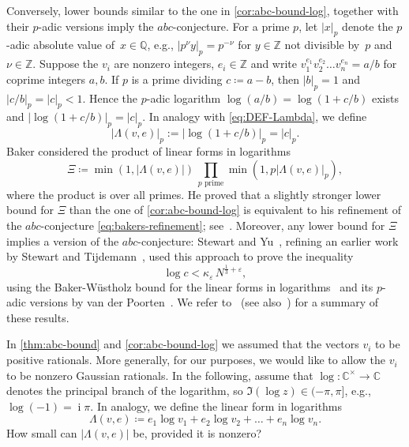 \documentclass[a4paper,USenglish,cleveref,numberwithinsect]{lipics-v2021}
\DeclareMathOperator{\ii}{i}
\newcommand{\QQ}{\mathbb{Q}}
\newcommand{\CC}{\mathbb{C}}
\newcommand{\ZZ}{\mathbb{Z}}
\numberwithin{equation}{section}
\begin{document}
\begin{remark}
Conversely, lower bounds similar to the one in \cref{cor:abc-bound-log},
together with their $p$-adic versions imply the $abc$-conjecture.
For a prime $p$, let $|x|_p$ denote the $p$-adic absolute value of~$x\in\QQ$,
e.g., $|p^\nu y|_p = p^{-\nu}$ for $y\in\ZZ$ not divisible by~$p$ and $\nu\in\ZZ$.
Suppose the $v_i$ are nonzero integers, $e_i\in\ZZ$ and write
$v_1^{e_1} v_2^{e_2}\dots v_n^{e_n} = a/b$ for coprime integers $a,b$.
If $p$ is a prime dividing $c\coloneqq a-b$,
then $|b|_p=1$ and $|c/b|_p = |c|_p <1$.
Hence the $p$-adic logarithm $\log(a/b)=\log(1+c/b)$ exists %
and $|\log(1+c/b)|_p = |c|_p$.
In analogy with \cref{eq:DEF-Lambda}, %
we define
\[
 |\Lambda(v,e)|_p := |\log(1+c/b)|_p = |c|_p.
\]
Baker considered the product of linear forms in logarithms
\[
 \Xi \coloneqq \min( 1 , |\Lambda(v,e)| ) \, \prod_{p\text{ prime}} \min( 1, p |\Lambda(v,e)|_p) ,
\]
where the product is over all primes.
He proved that a slightly stronger lower bound for $\Xi$ than the one of \cref{cor:abc-bound-log}
is equivalent to his refinement of the $abc$-conjecture \cref{eq:bakers-refinement};
see~\cite[Section~5]{baker98}.
Moreover, any lower bound for $\Xi$ implies a version of the $abc$-conjecture:
Stewart and Yu~\cite{yu-stewart},
refining an earlier work by Stewart and Tijdemann~\cite{stewart_oesterle-masser_1986},
used this approach to prove the inequality
\[
 \log c < \kappa_\varepsilon\, N^{\frac{1}{3}+\varepsilon},
\]
using the Baker-W\"{u}stholz bound for the linear forms in logarithms~\cite{wustholz1993}
and its $p$-adic versions by van der Poorten~\cite{vdpoorten}.
We refer to~\cite[Chapter~3.7]{baker_wustholz_2008}
(see also~\cite{granvilletucker}) for a summary of these results.
\end{remark}

In \cref{thm:abc-bound} and \cref{cor:abc-bound-log}
we assumed that the vectors $v_i$ to be positive rationals.
More generally, for our purposes, we would like to allow the $v_i$ to
be nonzero Gaussian rationals.
In the following, assume that $\log:\CC^\times\rightarrow\CC$ denotes the principal branch of the logarithm,
so $\Im(\log z)\in (-\pi,\pi]$, e.g., $\log(-1)=\ii\pi$.
In analogy, we define  the linear form in logarithms %
\begin{equation}
\label{eq:form-in-log-def}
	\Lambda(v,e)\coloneqq e_1 \log v_1 + e_2\log v_2 +\dots +e_n\log v_n.
\end{equation}
How small can $|\Lambda(v,e)|$ be, provided it is nonzero?
\end{document}
